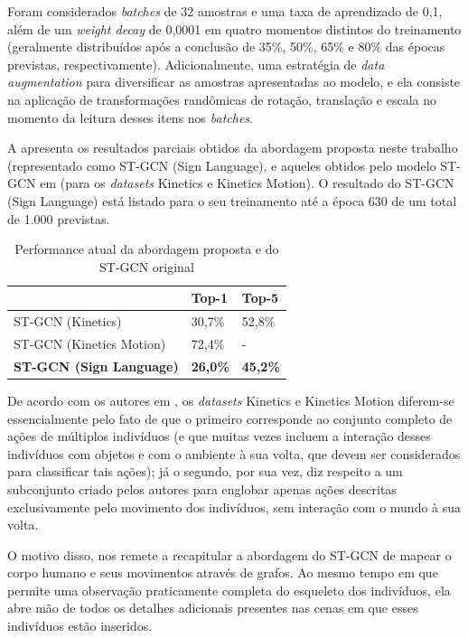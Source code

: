 Foram considerados \textit{batches} de 32 amostras e uma taxa de aprendizado de 0,1, além de um \textit{weight decay} de 0,0001 em quatro momentos distintos do treinamento (geralmente distribuídos após a conclusão de 35\%, 50\%, 65\% e 80\% das épocas previstas, respectivamente). 
Adicionalmente, uma estratégia de \textit{data augmentation} para diversificar as amostras apresentadas ao modelo, e ela consiste na aplicação de transformações randômicas de rotação, translação e escala no momento da leitura desses itens nos \textit{batches}.

A  apresenta os resultados parciais obtidos da abordagem proposta neste trabalho (representado como ST-GCN (Sign Language), e aqueles obtidos pelo modelo ST-GCN em \cite{st-gcn-2018} (para os \textit{datasets} Kinetics e Kinetics Motion). O resultado do ST-GCN (Sign Language) está listado para o seu treinamento até a época 630 de um total de 1.000 previstas.

\begin{table}[ht]
    \centering
    \caption{Performance atual da abordagem proposta e do ST-GCN original}
    \label{tab:resultados-1}
    \begin{tabular}{@{}lll@{}} \toprule
                                        &   Top-1           &   Top-5           \\ \midrule
        ST-GCN (Kinetics)               &   30,7\%          &   52,8\%          \\
        ST-GCN (Kinetics Motion)        &   72,4\%          &   -               \\ \midrule
        \textbf{ST-GCN (Sign Language)} & \textbf{26,0\%}   &   \textbf{45,2\%} \\ \bottomrule
    \end{tabular}
\end{table}

De acordo com os autores em \cite{st-gcn-2018}, os \textit{datasets} Kinetics e Kinetics Motion diferem-se essencialmente pelo fato de que o primeiro corresponde ao conjunto completo de ações de múltiplos indivíduos (e que muitas vezes incluem a interação desses indivíduos com objetos e com o ambiente à sua volta, que devem ser considerados para classificar tais ações); já o segundo, por sua vez, diz respeito a um subconjunto criado pelos autores para englobar apenas ações descritas exclusivamente pelo movimento dos indivíduos, sem interação com o mundo à sua volta. 

O motivo disso, nos remete a recapitular a abordagem do ST-GCN de mapear o corpo humano e seus movimentos através de grafos. Ao mesmo tempo em que permite uma observação praticamente completa do esqueleto dos indivíduos, ela abre mão de todos os detalhes adicionais presentes nas cenas em que esses indivíduos estão inseridos. 

